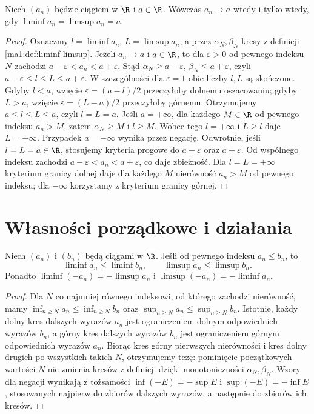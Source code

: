 \begin{twierdzenie}
\label{ma1:thm:liminf-limsup-convergence}
Niech $(a_n)$ będzie ciągiem w $\overline{\R}$ i $a\in\overline{\R}$. Wówczas $a_n\to a$ wtedy i tylko wtedy, gdy $\liminf a_n=\limsup a_n=a$.
\end{twierdzenie}
\begin{proof}
Oznaczmy $l=\liminf a_n$, $L=\limsup a_n$, a przez $\alpha_N,\beta_N$ kresy z definicji \ref{ma1:def:liminf-limsup}. Jeżeli $a_n\to a$ i $a\in\R$, to dla $\varepsilon>0$ od pewnego indeksu $N$ zachodzi $a-\varepsilon<a_n<a+\varepsilon$. Stąd $\alpha_N\ge a-\varepsilon$, $\beta_N\le a+\varepsilon$, czyli $a-\varepsilon\le l\le L\le a+\varepsilon$. W szczególności dla $\varepsilon=1$ obie liczby $l,L$ są skończone. Gdyby $l<a$, wzięcie $\varepsilon=(a-l)/2$ przeczyłoby dolnemu oszacowaniu; gdyby $L>a$, wzięcie $\varepsilon=(L-a)/2$ przeczyłoby górnemu. Otrzymujemy $a\le l\le L\le a$, czyli $l=L=a$. Jeśli $a=+\infty$, dla każdego $M\in\R$ od pewnego indeksu $a_n>M$, zatem $\alpha_N\ge M$ i $l\ge M$. Wobec tego $l=+\infty$ i $L\ge l$ daje $L=+\infty$. Przypadek $a=-\infty$ wynika przez negację.
Odwrotnie, jeśli $l=L=a\in\R$, stosujemy kryteria progowe do $a-\varepsilon$ oraz $a+\varepsilon$. Od wspólnego indeksu zachodzi $a-\varepsilon<a_n<a+\varepsilon$, co daje zbieżność. Dla $l=L=+\infty$ kryterium granicy dolnej daje dla każdego $M$ nierówność $a_n>M$ od pewnego indeksu; dla $-\infty$ korzystamy z kryterium granicy górnej.
\end{proof}

\section{Własności porządkowe i działania}
\begin{twierdzenie}
\label{ma1:thm:limsup-order}
Niech $(a_n)$ i $(b_n)$ będą ciągami w $\overline{\R}$. Jeśli od pewnego indeksu $a_n\le b_n$, to
\[
 \liminf a_n\le\liminf b_n,\qquad \limsup a_n\le\limsup b_n.
\]
Ponadto $\liminf(-a_n)=-\limsup a_n$ i $\limsup(-a_n)=-\liminf a_n$.
\end{twierdzenie}
\begin{proof}
Dla $N$ co najmniej równego indeksowi, od którego zachodzi nierówność, mamy $\inf_{n\ge N}a_n\le\inf_{n\ge N}b_n$ oraz $\sup_{n\ge N}a_n\le\sup_{n\ge N}b_n$. Istotnie, każdy dolny kres dalszych wyrazów $a_n$ jest ograniczeniem dolnym odpowiednich wyrazów $b_n$, a górny kres dalszych wyrazów $b_n$ jest ograniczeniem górnym odpowiednich wyrazów $a_n$. Biorąc kres górny pierwszych nierówności i kres dolny drugich po wszystkich takich $N$, otrzymujemy tezę: pominięcie początkowych wartości $N$ nie zmienia kresów z definicji dzięki monotoniczności $\alpha_N,\beta_N$. Wzory dla negacji wynikają z tożsamości $\inf(-E)=-\sup E$ i $\sup(-E)=-\inf E$, stosowanych najpierw do zbiorów dalszych wyrazów, a następnie do zbiorów ich kresów.
\end{proof}

